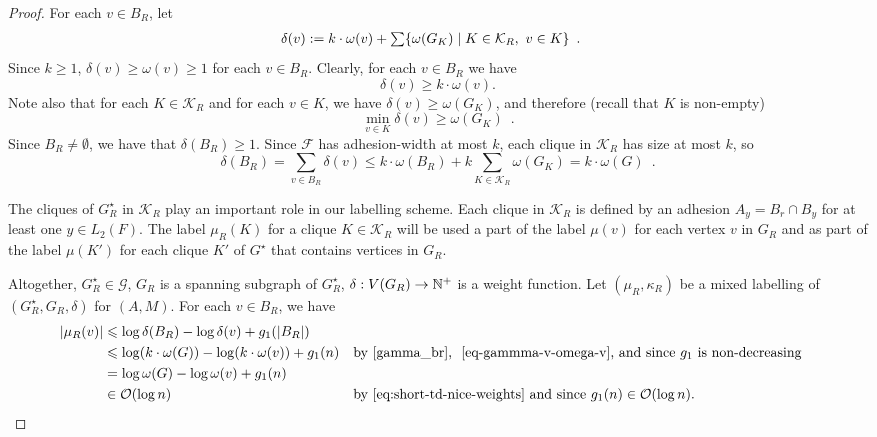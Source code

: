 \documentclass{patmorin}
\let\eqref\cref
\renewcommand{\ge}{\geqslant}
\renewcommand{\le}{\leqslant}
\renewcommand{\geq}{\geqslant}
\newcommand{\Oh}{\mathcal{O}}
\DeclarePairedDelimiter{\set}{\{}{\}}
\begin{document}
\begin{proof}
    For each $v\in B_R$, let
    \begin{align*}
    \delta(v)&:=k\cdot\omega(v)+\textstyle\sum\set{\omega(G_K)\mid K\in\mathcal{K}_R,\ v\in K} \enspace .
    \end{align*}
    Since $k\geq1$, $\delta(v)\geq\omega(v)\geq 1$ for each $v\in B_R$.
    Clearly, for each $v\in B_R$ we have
    \begin{equation}
    \label{eq-gammma-v-omega-v}
    \delta(v) \geq k\cdot\omega(v).
    \end{equation}
    Note also that for each $K\in\mathcal{K}_R$ and for each $v\in K$, we have $\delta(v)\ge \omega(G_K)$, and therefore (recall that $K$ is non-empty)
    \begin{equation}
       \min_{v\in K}\delta(v) \ge \omega(G_K) \enspace . \label{gamma_v_lower_bound}
    \end{equation}
    Since $B_R\neq\emptyset$, we have that $\delta(B_R)\geq1$.
    Since $\mathcal{F}$ has adhesion-width at most $k$, each clique in $\mathcal{K}_R$ has size at most $k$, so
    \begin{equation}
       \delta(B_R)=\sum_{v\in B_R}\delta(v)
       \le k\cdot\omega(B_R) + k\sum_{K\in\mathcal{K}_R}\omega(G_K)
       = k\cdot\omega(G)  \enspace . \label{gamma_br}
    \end{equation}

    The cliques of $G^\star_R$ in $\mathcal{K}_R$ play an important role in our labelling scheme.
    Each clique in $\mathcal{K}_R$ is defined by an adhesion $A_y=B_r\cap B_y$ for at least one $y\in L_2(F)$.  The label $\mu_R(K)$ for a clique $K\in\mathcal{K}_R$ will be used a part of the label $\mu(v)$ for each vertex $v$ in $G_R$ and as part of the label $\mu(K')$ for each clique $K'$ of $G^\star$ that contains vertices in $G_R$.

    Altogether, $G^\star_R\in\mathcal{G}$, $G_R$ is a spanning subgraph of $G^\star_R$, $\delta:V(G_R)\to\mathbb{N}^+$ is a weight function. Let $(\mu_R,\kappa_R)$ be a mixed labelling of $(G^\star_R, G_R, \delta)$ for $(A, M)$. For each $v\in B_R$, we have
    \begin{align}
       |\mu_R(v)|&\le \log \delta(B_R)-\log\delta(v)+g_1(|B_R|)\notag\\
       &\le \log (k\cdot\omega(G)) - \log (k\cdot\omega(v)) + g_1(n)&&\textrm{by~\eqref{gamma_br}, ~\eqref{eq-gammma-v-omega-v}, and since $g_1$ is non-decreasing}\notag\\
       &= \log\omega(G) - \log\omega(v) + g_1(n)\label{eq:mu-R-bounded-in-omega}\\
       &\in\Oh(\log n)&&\textrm{by~\eqref{eq:short-td-nice-weights} and since $g_1(n)\in\Oh(\log n)$.}
       \label{eq:mu-R-in-logn}
    \end{align}


\end{proof}
\end{document}
